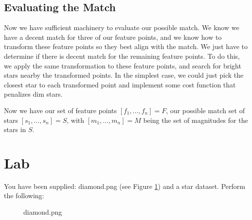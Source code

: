 \documentclass[paper=a4, fontsize=11pt]{scrartcl} %
\begin{document}

\subsection{Evaluating the Match}

Now we have sufficient machinery to evaluate our possible match.  We know we have a decent match for three of our feature points, and we know how to transform these feature points so they best align with the match. We just have to determine if there is decent match for the remaining feature points. To do this, we apply the same transformation to these feature points, and search for bright stars nearby the transformed points. In the simplest case, we could just pick the closest star to each transformed point and implement some cost function that penalizes dim stars.

Now we have our set of feature points $[f_1,\ldots,f_n]=F$, our possible match set of stars $[s_1,\ldots,s_n] = S$, with $[m_1,\ldots,m_n] = M$ being the set of magnitudes for the stars in $S$.




\section{Lab}
You have been supplied: diamond.png (see Figure \ref{diamond}) and a star dataset. Perform the following: 

\begin{figure}
\caption{diamond.png}
\label{diamond}
\end{figure}
\end{document}

